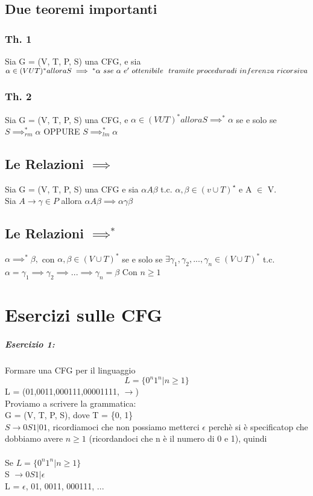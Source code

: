 \documentclass[12pt, a4paper, openany, oneside]{book}
\begin{document}
\section{Due teoremi importanti}
\subsection{Th. 1}
Sia G = (V, T, P, S) una CFG, e sia $\alpha \in (VUT)^{*} allora 
S \implies ^{*}\alpha ~sse~ \alpha ~ e' ~ ottenibile ~ tramite ~ procedura ~
\\ di  ~ inferenza ~ ricorsiva$
\subsection{Th. 2}
Sia G = (V, T, P, S) una CFG, e $\alpha \in (VUT)^{*} allora S \implies ^{*} \alpha$
se e solo se $S \implies_{rm}^{*} \alpha$ OPPURE $S \implies _{lm} ^{*} \alpha$
\section{Le Relazioni $\implies$}
Sia G = (V, T, P, S) una CFG e sia $\alpha A \beta$ t.c. $\alpha , \beta \in
(v\cup T)^{\star}$ e A $\in$ V. \\
Sia $A \to \gamma \in P$ allora $\alpha A \beta \implies \alpha \gamma \beta$
\section{Le Relazioni $\implies^{*}$}
$\alpha \implies^{*} \beta ,$ con $\alpha, \beta \in (V \cup T)^{*}$ se e solo se
$\exists \gamma_{1}, \gamma_{2}, ... , \gamma_{n} \in (V \cup T)^{*}$ t.c.
$\alpha = \gamma_{1} \implies \gamma_{2} \implies ... \implies \gamma_{n} = \beta$
Con $n \geq 1$
\chapter{Esercizi sulle CFG}
\paragraph{Esercizio 1: }Formare una CFG per il linguaggio \\
$$L = \{0^{n} 1^{n} | n \geq 1 \}$$
L = (01,0011,000111,00001111, $\to$)
\\ Proviamo a scrivere la grammatica: \\
G = (V, T, P, S), dove T = \{0, 1\} \\
$S \to 0S1 | 01$, ricordiamoci che non possiamo metterci $\epsilon$ perchè si è
specificatop che dobbiamo avere $n \geq 1$ (ricordandoci che n è il 
numero di 0 e 1), quindi 
\\ \\
Se $L = \{0^{n} 1^{n} | n \geq 1 \}$ \\
S $\to 0S1 | \epsilon$ \\
L = {$\epsilon$, 01, 0011, 000111, ...}
\end{document}
